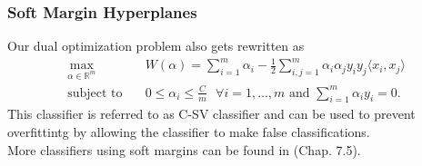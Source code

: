 \documentclass{beamer}
\begin{document}
\begin{frame}{}
	\frametitle{Soft Margin Hyperplanes}
	Our dual optimization problem also gets rewritten as
    \begin{equation} \label{eq:7}
        \begin{aligned}
            \max_{\alpha \in \mathbb{R}^m} \quad & W(\alpha) = \sum_{i=1}^{m} \alpha_i - \frac{1}{2} \sum_{i,j=1}^{m} \alpha_i \alpha_j y_i y_j \langle x_i,x_j \rangle \\
            \textrm{subject to} \quad & 0 \leq \alpha_i \leq \frac{C}{m} \text{ } \forall i = {1, \dots, m} \text{ and } \sum_{i=1}^{m} \alpha_i y_i = 0. 
        \end{aligned}
	\end{equation}
	This classifier is referred to as C-SV classifier and can be used to prevent overfittintg by allowing the classifier to make false classifications. \\
	More classifiers using soft margins can be found in \cite{Schoelkopf}(Chap. 7.5).
\end{frame}
\end{document}
